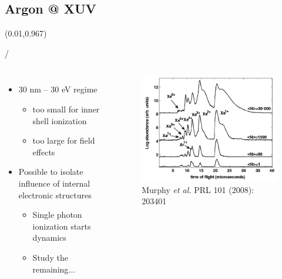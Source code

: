 \documentclass{beamer}
\makeatletter
\newcommand{\framenumber}{
\begin{textblock}{0}(0.01,0.967)
\begin{scriptsize}
{\color{gray}\insertframenumber/\inserttotalframenumber}
\end{scriptsize}
\end{textblock}
}
\makeatother
\begin{document}
\subsection{Argon @ XUV}
\begin{frame}{}\framenumber
\begin{columns}
		\begin{itemize}
		\item 30 nm -- 30 eV regime
			\begin{itemize}
			\item too small for inner shell ionization
			\item too large for field effects
			\end{itemize}
		\item Possible to isolate influence of internal electronic structures
		\begin{itemize}
			\item Single photon ionization starts dynamics
			\item Study the remaining...
		\end{itemize}
		\end{itemize}

		\begin{figure}
			\includegraphics[width=\textwidth]{figures/Murphy2008_fig3}
			\caption{{\tiny Murphy \textit{et al.} PRL 101 (2008): 203401}}
		\end{figure}
\end{columns}
\end{frame}
\end{document}

